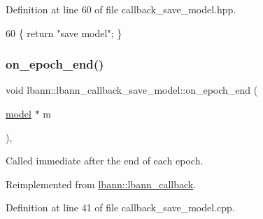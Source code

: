 Definition at line 60 of file callback\+\_\+save\+\_\+model.\+hpp.


\begin{DoxyCode}
60 \{ \textcolor{keywordflow}{return} \textcolor{stringliteral}{"save model"}; \}
\end{DoxyCode}
\mbox{\label{classlbann_1_1lbann__callback__save__model_ae047ee35b65e9bda4080a83833612699}} 
\subsubsection{\texorpdfstring{on\+\_\+epoch\+\_\+end()}{on\_epoch\_end()}}
{\footnotesize\ttfamily void lbann\+::lbann\+\_\+callback\+\_\+save\+\_\+model\+::on\+\_\+epoch\+\_\+end (\begin{DoxyParamCaption}\item[{\hyperlink{classlbann_1_1model}{model} $\ast$}]{m }\end{DoxyParamCaption})\hspace{0.3cm}{\ttfamily [override]}, {\ttfamily [virtual]}}

Called immediate after the end of each epoch. 

Reimplemented from \hyperlink{classlbann_1_1lbann__callback_a1fc71110e7f754bf73c9e0f344a448a5}{lbann\+::lbann\+\_\+callback}.



Definition at line 41 of file callback\+\_\+save\+\_\+model.\+cpp.


